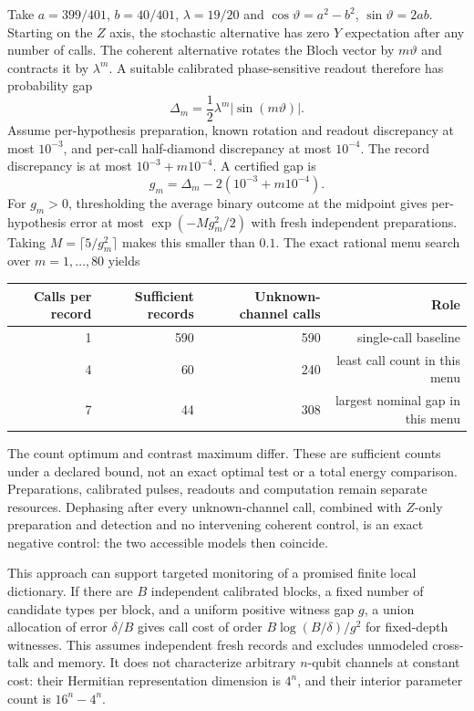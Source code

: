 Take $a=399/401$, $b=40/401$, $\lambda=19/20$ and
$\cos\vartheta=a^2-b^2$, $\sin\vartheta=2ab$. Starting on the $Z$ axis,
the stochastic alternative has zero $Y$ expectation after any number of
calls. The coherent alternative rotates the Bloch vector by $m\vartheta$
and contracts it by $\lambda^m$. A suitable calibrated phase-sensitive
readout therefore has probability gap
\begin{equation}
 \Delta_m=\frac12\lambda^m|\sin(m\vartheta)|.
\end{equation}
Assume per-hypothesis preparation, known rotation and readout discrepancy
at most $10^{-3}$, and per-call half-diamond discrepancy at most $10^{-4}$.
The record discrepancy is at most $10^{-3}+m10^{-4}$. A certified gap is
\begin{equation}
 g_m=\Delta_m-2(10^{-3}+m10^{-4}).
\end{equation}
For $g_m>0$, thresholding the average binary outcome at the midpoint gives
per-hypothesis error at most $\exp(-Mg_m^2/2)$ with fresh independent
preparations. Taking $M=\lceil5/g_m^2\rceil$ makes this smaller than $0.1$.
The exact rational menu search over $m=1,\ldots,80$ yields
\begin{center}
\small
\begin{tabular}{rrrr}
\hline
Calls per record & Sufficient records & Unknown-channel calls & Role\\
\hline
1&590&590&single-call baseline\\
4&60&240&least call count in this menu\\
7&44&308&largest nominal gap in this menu\\
\hline
\end{tabular}
\end{center}
The count optimum and contrast maximum differ. These are sufficient counts
under a declared bound, not an exact optimal test or a total energy comparison.
Preparations, calibrated pulses, readouts and computation remain separate
resources. Dephasing after every unknown-channel call, combined with
$Z$-only preparation and detection and no intervening coherent control,
is an exact negative control: the two accessible models then coincide.

This approach can support targeted monitoring of a promised finite local
dictionary. If there are $B$ independent calibrated blocks, a fixed number
of candidate types per block, and a uniform positive witness gap $g$, a
union allocation of error $\delta/B$ gives call cost of order
$B\log(B/\delta)/g^2$ for fixed-depth witnesses. This assumes independent
fresh records and excludes unmodeled cross-talk and memory. It does not
characterize arbitrary $n$-qubit channels at constant cost: their Hermitian
representation dimension is $4^n$, and their interior parameter count is
$16^n-4^n$.


